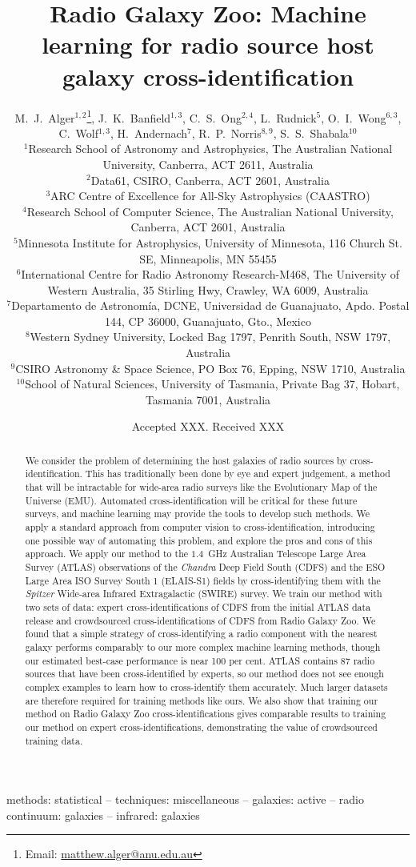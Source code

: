 \documentclass[fleqn,usenatbib,usedcolumn]{mnras}
\title[Machine learning for radio cross-identification]{Radio Galaxy Zoo: Machine learning for radio source host galaxy cross-identification}
\author[Alger et al.]{M.~J.~Alger$^{1, 2}$\thanks{Email: \href{mailto:matthew.alger@anu.edu.au}{matthew.alger@anu.edu.au}},
  J.~K.~Banfield$^{1, 3}$,
  C.~S.~Ong$^{2, 4}$,
  L.~Rudnick$^{5}$,
  O.~I.~Wong$^{6, 3}$,
  C.~Wolf$^{1, 3}$,
  \newauthor
  H.~Andernach$^{7}$,
  R.~P.~Norris$^{8, 9}$,
  S.~S.~Shabala$^{10}$
\\
$^{1}$Research School of Astronomy and Astrophysics, The Australian National University, Canberra, ACT 2611, Australia\\
$^{2}$Data61, CSIRO, Canberra, ACT 2601, Australia\\
$^{3}$ARC Centre of Excellence for All-Sky Astrophysics (CAASTRO)\\
$^{4}$Research School of Computer Science, The Australian National University, Canberra, ACT 2601, Australia\\
$^{5}$Minnesota Institute for Astrophysics, University of Minnesota, 116 Church St. SE, Minneapolis, MN 55455\\
$^{6}$International Centre for Radio Astronomy Research-M468, The University of Western Australia, 35 Stirling Hwy, Crawley, WA 6009, Australia\\
$^{7}$Departamento de Astronom\'ia, DCNE, Universidad de Guanajuato, Apdo. Postal 144, CP 36000, Guanajuato, Gto., Mexico\\
$^{8}$Western Sydney University, Locked Bag 1797, Penrith South, NSW 1797, Australia\\
$^{9}$CSIRO Astronomy \& Space Science, PO Box 76, Epping, NSW 1710, Australia\\
$^{10}$School of Natural Sciences, University of Tasmania, Private Bag 37, Hobart, Tasmania 7001, Australia
}
\date{Accepted XXX. Received XXX}
\newcommand{\edited}[1]{#1}
\begin{document}
\label{firstpage}
\pagerange{\pageref{firstpage}--\pageref{lastpage}}
\maketitle

\begin{abstract}
  We consider the problem of determining the host galaxies of radio sources by
  cross-identification. This has traditionally been done by eye and expert
  judgement, a method that will be intractable for wide-area radio surveys
  like the Evolutionary Map of the Universe (EMU). \edited{Automated
  cross-identification will be critical for these future surveys, and machine
  learning may provide the tools to develop such methods. We apply a standard
  approach from computer vision to cross-identification, introducing one
  possible way of automating this problem, and explore the pros and cons of
  this approach}. We apply our method to the $1.4$~GHz Australian Telescope
  Large Area Survey (ATLAS) observations of the \emph{Chandra} Deep Field
  South (CDFS) and the ESO Large Area ISO Survey South 1 (ELAIS-S1) fields by
  cross-identifying them with the \emph{Spitzer} Wide-area Infrared
  Extragalactic (SWIRE) survey. We train our method with two sets of
  data: expert cross-identifications of CDFS from the initial ATLAS data
  release and crowdsourced cross-identifications of CDFS from Radio Galaxy
  Zoo. \edited{We found that a simple strategy of cross-identifying a radio component
  with the nearest galaxy performs comparably to our more complex machine learning methods, though our estimated best-case performance is near 100 per cent.
  ATLAS contains 87 radio sources that have been cross-identified by experts,
  so our method does not see enough
  complex examples to learn how to cross-identify them accurately. Much larger
  datasets are therefore required for training methods like ours. We also show
  that training our method on Radio Galaxy Zoo cross-identifications gives
  comparable results to training our method on expert cross-identifications,
  demonstrating the value of crowdsourced training data.}
\end{abstract}

\begin{keywords}
methods: statistical -- techniques: miscellaneous -- galaxies: active -- radio continuum: galaxies -- infrared: galaxies\\
\end{keywords}
\end{document}
